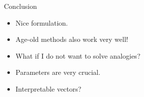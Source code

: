\begin{frame}{Conclusion}
  \begin{itemize}[<+->]
  \item Nice formulation.
  \item Age-old methods also work very well!
  \item What if I do not want to solve analogies?
  \item Parameters are very crucial.
  \item Interpretable vectors?
  \end{itemize}
\end{frame}

